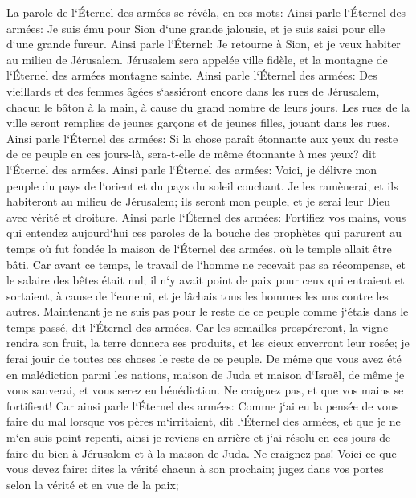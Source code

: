 \verse La parole de l`Éternel des armées se révéla, en ces mots: 
\verse Ainsi parle l`Éternel des armées: Je suis ému pour Sion d`une grande jalousie, et je suis saisi pour elle d`une grande fureur. 
\verse Ainsi parle l`Éternel: Je retourne à Sion, et je veux habiter au milieu de Jérusalem. Jérusalem sera appelée ville fidèle, et la montagne de l`Éternel des armées montagne sainte. 
\verse Ainsi parle l`Éternel des armées: Des vieillards et des femmes âgées s`assiéront encore dans les rues de Jérusalem, chacun le bâton à la main, à cause du grand nombre de leurs jours. 
\verse Les rues de la ville seront remplies de jeunes garçons et de jeunes filles, jouant dans les rues. 
\verse Ainsi parle l`Éternel des armées: Si la chose paraît étonnante aux yeux du reste de ce peuple en ces jours-là, sera-t-elle de même étonnante à mes yeux? dit l`Éternel des armées. 
\verse Ainsi parle l`Éternel des armées: Voici, je délivre mon peuple du pays de l`orient et du pays du soleil couchant. 
\verse Je les ramènerai, et ils habiteront au milieu de Jérusalem; ils seront mon peuple, et je serai leur Dieu avec vérité et droiture. 
\verse Ainsi parle l`Éternel des armées: Fortifiez vos mains, vous qui entendez aujourd`hui ces paroles de la bouche des prophètes qui parurent au temps où fut fondée la maison de l`Éternel des armées, où le temple allait être bâti. 
\verse Car avant ce temps, le travail de l`homme ne recevait pas sa récompense, et le salaire des bêtes était nul; il n`y avait point de paix pour ceux qui entraient et sortaient, à cause de l`ennemi, et je lâchais tous les hommes les uns contre les autres. 
\verse Maintenant je ne suis pas pour le reste de ce peuple comme j`étais dans le temps passé, dit l`Éternel des armées. 
\verse Car les semailles prospéreront, la vigne rendra son fruit, la terre donnera ses produits, et les cieux enverront leur rosée; je ferai jouir de toutes ces choses le reste de ce peuple. 
\verse De même que vous avez été en malédiction parmi les nations, maison de Juda et maison d`Israël, de même je vous sauverai, et vous serez en bénédiction. Ne craignez pas, et que vos mains se fortifient! 
\verse Car ainsi parle l`Éternel des armées: Comme j`ai eu la pensée de vous faire du mal lorsque vos pères m`irritaient, dit l`Éternel des armées, et que je ne m`en suis point repenti, 
\verse ainsi je reviens en arrière et j`ai résolu en ces jours de faire du bien à Jérusalem et à la maison de Juda. Ne craignez pas! 
\verse Voici ce que vous devez faire: dites la vérité chacun à son prochain; jugez dans vos portes selon la vérité et en vue de la paix; 
